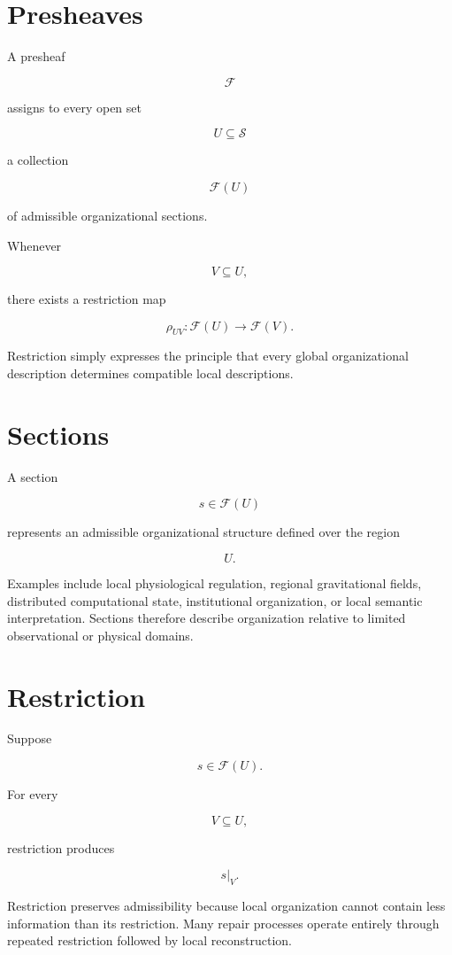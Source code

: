 \documentclass[11pt,oneside]{book}
\numberwithin{equation}{chapter}
\theoremstyle{definition}
\theoremstyle{plain}
\begin{document}
\section{Presheaves}

A presheaf

\[
\mathcal F
\]

assigns to every open set

\[
U
\subseteq
\mathcal S
\]

a collection

\[
\mathcal F(U)
\]

of admissible organizational sections.

Whenever

\[
V
\subseteq
U,
\]

there exists a restriction map

\[
\rho_{UV}
:
\mathcal F(U)
\rightarrow
\mathcal F(V).
\]

Restriction simply expresses the principle that every global
organizational description determines compatible local descriptions.

\section{Sections}

A section

\[
s
\in
\mathcal F(U)
\]

represents an admissible organizational structure defined over the region

\[
U.
\]

Examples include local physiological regulation, regional gravitational fields, distributed computational state, institutional organization, or local semantic interpretation. Sections therefore describe organization relative to limited observational or physical domains.

\section{Restriction}

Suppose

\[
s
\in
\mathcal F(U).
\]

For every

\[
V
\subseteq
U,
\]

restriction produces

\[
s|_V.
\]

Restriction preserves admissibility because local organization cannot contain less information than its restriction. Many repair processes operate entirely through repeated restriction followed by local reconstruction.
\end{document}
